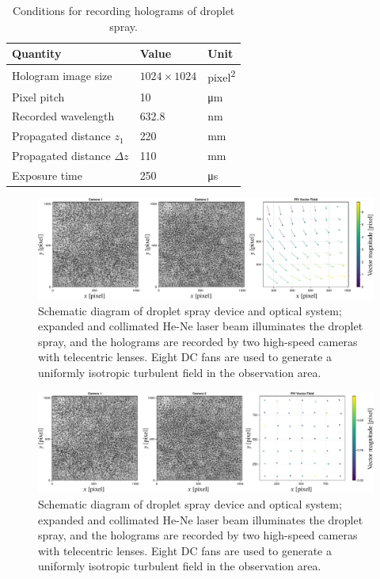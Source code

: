 \begin{table}[H]
    \centering
    \caption{Conditions for recording holograms of droplet spray.}
    \label{table:dropletSprayCondition}
    \begin{tabular}{lll}
    Quantity & Value & Unit \\ \hline \hline
    Hologram image size & $\num{1024} \times \num{1024}$ & \si{pixel\squared} \\ \hline
    Pixel pitch & \num{10} & \si{\um} \\ \hline
    Recorded wavelength & \num{632.8} & \si{\nm} \\ \hline
    Propagated distance $z_1$ & \num{220} & \si{\mm} \\ \hline
    Propagated distance $\Delta z$ & \num{110} & \si{\mm} \\ \hline
    Exposure time & \num{250} & \si{\us} \\ \hline

    \end{tabular}
\end{table}


\begin{figure}[H]
    \centering
    \includegraphics[width=0.98\linewidth]{./Figure/3_Methods/beforebundle.pdf}
    \caption{Schematic diagram of droplet spray device and optical system; expanded and collimated He-Ne laser beam illuminates the droplet spray, and the holograms are recorded by two high-speed cameras with telecentric lenses. Eight DC fans are used to generate a uniformly isotropic turbulent field in the observation area.}
    \label{fig:beforebundle}
\end{figure}

\begin{figure}[H]
    \centering
    \includegraphics[width=0.98\linewidth]{./Figure/3_Methods/afterbundle.pdf}
    \caption{Schematic diagram of droplet spray device and optical system; expanded and collimated He-Ne laser beam illuminates the droplet spray, and the holograms are recorded by two high-speed cameras with telecentric lenses. Eight DC fans are used to generate a uniformly isotropic turbulent field in the observation area.}
    \label{fig:afterbundle}
\end{figure}